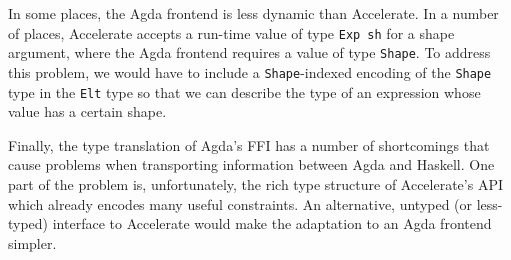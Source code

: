 \documentclass{llncs}
\begin{document}
In some places, the Agda frontend is less dynamic than Accelerate. In
a number of places, Accelerate accepts a run-time value of type
\texttt{Exp sh} for a shape argument, where the Agda frontend requires
a value of type \texttt{Shape}. To address this problem, we would have
to include a \texttt{Shape}-indexed encoding of the \texttt{Shape}
type in the \texttt{Elt} type so that we can describe the type of
an expression whose value has a certain shape. 

Finally, the type translation of Agda's FFI has a number of shortcomings that
cause problems when transporting information between Agda
and Haskell. One part of the problem is, unfortunately, the rich type
structure of Accelerate's API which already encodes many useful
constraints. An alternative, untyped (or less-typed) interface to
Accelerate would make the adaptation to an Agda frontend simpler.

%
%


\end{document}
